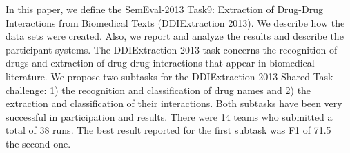 In this paper, we define the SemEval-2013 Task9: Extraction of Drug-Drug Interactions from Biomedical Texts (DDIExtraction 2013). We describe how the
 data sets were created. Also, we report and analyze the results and describe
 the participant systems.
 The DDIExtraction 2013 task concerns the recognition of drugs and extraction of
 drug-drug interactions that appear in biomedical literature. 
 We propose two subtasks for the DDIExtraction 2013 Shared Task challenge: 1)
 the recognition and classification of drug names and 2) the extraction and
 classification of their interactions.
 Both subtasks have been very successful in participation
 and results. There were 14 teams who submitted a total of 38 runs.
 The best result reported for the first subtask was F1 of 71.5\\%
 the second one.

